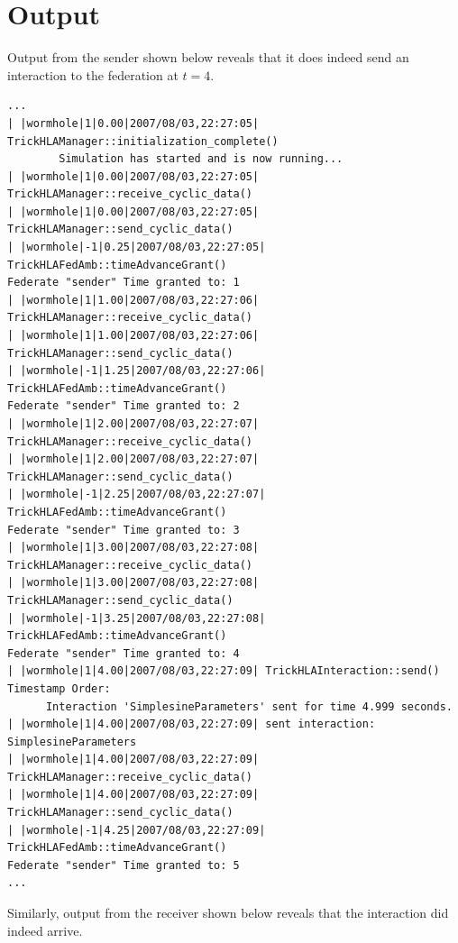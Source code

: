 \section{Output}

Output from the sender shown below reveals that it does indeed send an interaction to the federation at $t=4$.

\begin{lstlisting}[numbers=none,caption={{\em sender} output showing interaction at $t=4$}]
...
| |wormhole|1|0.00|2007/08/03,22:27:05| TrickHLAManager::initialization_complete()
        Simulation has started and is now running...
| |wormhole|1|0.00|2007/08/03,22:27:05| TrickHLAManager::receive_cyclic_data()
| |wormhole|1|0.00|2007/08/03,22:27:05| TrickHLAManager::send_cyclic_data()
| |wormhole|-1|0.25|2007/08/03,22:27:05| TrickHLAFedAmb::timeAdvanceGrant()
Federate "sender" Time granted to: 1
| |wormhole|1|1.00|2007/08/03,22:27:06| TrickHLAManager::receive_cyclic_data()
| |wormhole|1|1.00|2007/08/03,22:27:06| TrickHLAManager::send_cyclic_data()
| |wormhole|-1|1.25|2007/08/03,22:27:06| TrickHLAFedAmb::timeAdvanceGrant()
Federate "sender" Time granted to: 2
| |wormhole|1|2.00|2007/08/03,22:27:07| TrickHLAManager::receive_cyclic_data()
| |wormhole|1|2.00|2007/08/03,22:27:07| TrickHLAManager::send_cyclic_data()
| |wormhole|-1|2.25|2007/08/03,22:27:07| TrickHLAFedAmb::timeAdvanceGrant()
Federate "sender" Time granted to: 3
| |wormhole|1|3.00|2007/08/03,22:27:08| TrickHLAManager::receive_cyclic_data()
| |wormhole|1|3.00|2007/08/03,22:27:08| TrickHLAManager::send_cyclic_data()
| |wormhole|-1|3.25|2007/08/03,22:27:08| TrickHLAFedAmb::timeAdvanceGrant()
Federate "sender" Time granted to: 4
| |wormhole|1|4.00|2007/08/03,22:27:09| TrickHLAInteraction::send() Timestamp Order:
      Interaction 'SimplesineParameters' sent for time 4.999 seconds.
| |wormhole|1|4.00|2007/08/03,22:27:09| sent interaction: SimplesineParameters
| |wormhole|1|4.00|2007/08/03,22:27:09| TrickHLAManager::receive_cyclic_data()
| |wormhole|1|4.00|2007/08/03,22:27:09| TrickHLAManager::send_cyclic_data()
| |wormhole|-1|4.25|2007/08/03,22:27:09| TrickHLAFedAmb::timeAdvanceGrant()
Federate "sender" Time granted to: 5
...
\end{lstlisting}

Similarly, output from the receiver shown below reveals that
the interaction did indeed arrive.

